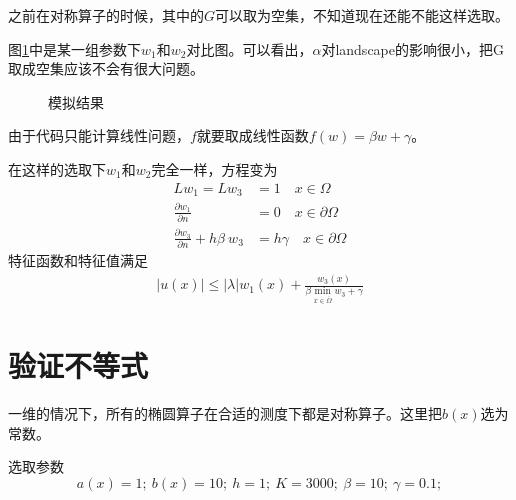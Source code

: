 \documentclass[12pt,a4paper]{article}
\begin{document}
之前在对称算子的时候，其中的$G$可以取为空集，不知道现在还能不能这样选取。

图\ref{dba}中是某一组参数下$w_1$和$w_2$对比图。可以看出，$\alpha$对landscape的影响很小，把G取成空集应该不会有很大问题。
\begin{figure}[h]
\centering
{}
\caption{模拟结果}
\label{dba}
\end{figure}

由于代码只能计算线性问题，$f$就要取成线性函数$f(w) = \beta w + \gamma$。

在这样的选取下$w_1$和$w_2$完全一样，方程变为
\begin{align*}
L w_1 = L w_3 & = 1 \quad x \in \Omega \\
\frac{\partial w_1}{\partial n} & = 0 \quad x \in \partial \Omega \\
\frac{\partial w_3}{\partial n} + h \beta \ w_3 & = h \gamma \quad x \in \partial \Omega
\end{align*}
特征函数和特征值满足
\begin{align*}
|u(x)| \leq |\lambda| w_1(x) + \frac{w_3(x)}{\beta \min_{x \in \overline{\Omega}} w_3 + \gamma}
\end{align*}

\section*{验证不等式}

一维的情况下，所有的椭圆算子在合适的测度下都是对称算子。这里把$b(x)$选为常数。

选取参数
$$ a(x) = 1; \ b(x) = 10; \ h = 1; \ K = 3000; \ \beta = 10; \ \gamma = 0.1; $$
\end{document}

